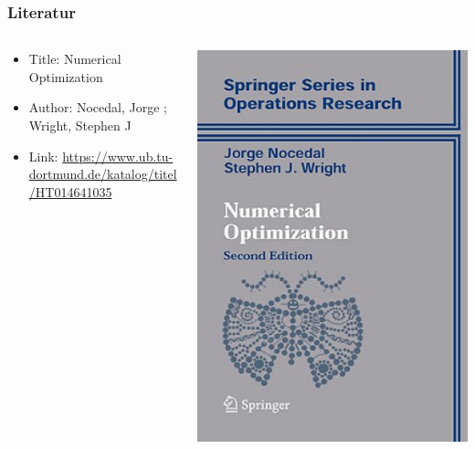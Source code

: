 	\begin{frame}
		\frametitle{Literatur}
		\begin{columns}[T]
			\begin{column}{0.49\textwidth}
				\begin{itemize}%
					\item Title: Numerical Optimization
					\item Author: Nocedal, Jorge ; Wright, Stephen J
					\item Link: \href{https://www.ub.tu-dortmund.de/katalog/titel/HT014641035}{https://www.ub.tu-dortmund.de/katalog/titel/HT014641035}
				\end{itemize}
			\end{column}
			\begin{column}{0.49\textwidth}
				\centering
				\includegraphics[scale=0.2]{pictures/numerical_optimization.png}
			\end{column}
		\end{columns}
	\end{frame}